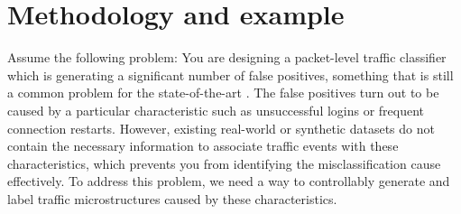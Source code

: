 


\section{Methodology and example}\label{Sec:Motivation}






Assume the following problem: You are designing a packet-level traffic classifier which is generating a significant number of false positives, something that is still a common problem for the state-of-the-art \cite{nisioti2018intrusion}. The false positives turn out to be caused by a particular characteristic such as unsuccessful logins or frequent connection restarts. However, existing real-world or synthetic datasets do not contain the necessary information to associate traffic events with these characteristics, which prevents you from identifying the misclassification cause effectively. To address this problem, we need a way to controllably generate and label traffic microstructures caused by these characteristics.

